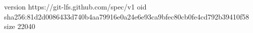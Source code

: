 version https://git-lfs.github.com/spec/v1
oid sha256:81d2d0086433d740b4aa79916e0a24e6e93ca9bfec80cb0fe4cd792b39410f58
size 22040
